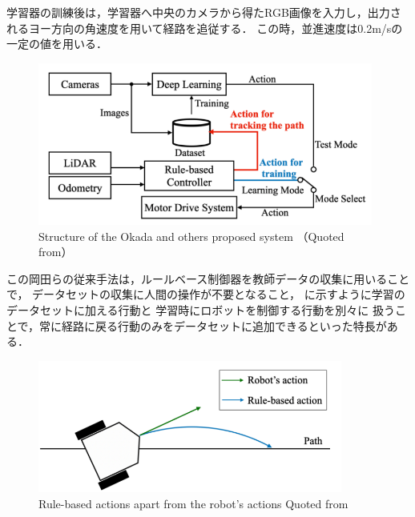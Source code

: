 学習器の訓練後は，学習器へ中央のカメラから得たRGB画像を入力し，出力されるヨー方向の角速度を用いて経路を追従する．
この時，並進速度は0.2m/sの一定の値を用いる．
\vspace{10zh}
\begin{figure}[htbp]
    \centering
     \includegraphics[width=110mm]{images/pdf/okada_method_sys.pdf}
     \caption{Structure of the Okada and others proposed system （Quoted from\cite{okada2020}）}
     \label{fig:okada_sys}
\end{figure}
\clearpage
この岡田らの従来手法は，ルールベース制御器を教師データの収集に用いることで，
データセットの収集に人間の操作が不要となること，
に示すように学習のデータセットに加える行動と
学習時にロボットを制御する行動を別々に
扱うことで，常に経路に戻る行動のみをデータセットに追加できるといった特長がある．
\begin{figure}[htbp]
    \centering
     \includegraphics[width=100mm]{images/pdf/robo_action.pdf}
     \caption{Rule-based actions
     apart from the robot's actions Quoted from\cite{okada2020}}
     \label{fig:robo_ac}
\end{figure}

